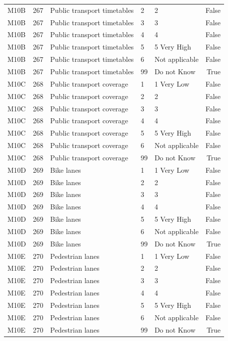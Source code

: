 \begin{tabular}{lrlllr}
M10B & 267 & Public transport timetables & 2 & 2 & False \\
M10B & 267 & Public transport timetables & 3 & 3 & False \\
M10B & 267 & Public transport timetables & 4 & 4 & False \\
M10B & 267 & Public transport timetables & 5 & 5 Very High & False \\
M10B & 267 & Public transport timetables & 6 & Not applicable & False \\
M10B & 267 & Public transport timetables & 99 & Do not Know & True \\
M10C & 268 & Public transport coverage & 1 & 1 Very Low & False \\
M10C & 268 & Public transport coverage & 2 & 2 & False \\
M10C & 268 & Public transport coverage & 3 & 3 & False \\
M10C & 268 & Public transport coverage & 4 & 4 & False \\
M10C & 268 & Public transport coverage & 5 & 5 Very High & False \\
M10C & 268 & Public transport coverage & 6 & Not applicable & False \\
M10C & 268 & Public transport coverage & 99 & Do not Know & True \\
M10D & 269 & Bike lanes & 1 & 1 Very Low & False \\
M10D & 269 & Bike lanes & 2 & 2 & False \\
M10D & 269 & Bike lanes & 3 & 3 & False \\
M10D & 269 & Bike lanes & 4 & 4 & False \\
M10D & 269 & Bike lanes & 5 & 5 Very High & False \\
M10D & 269 & Bike lanes & 6 & Not applicable & False \\
M10D & 269 & Bike lanes & 99 & Do not Know & True \\
M10E & 270 & Pedestrian lanes & 1 & 1 Very Low & False \\
M10E & 270 & Pedestrian lanes & 2 & 2 & False \\
M10E & 270 & Pedestrian lanes & 3 & 3 & False \\
M10E & 270 & Pedestrian lanes & 4 & 4 & False \\
M10E & 270 & Pedestrian lanes & 5 & 5 Very High & False \\
M10E & 270 & Pedestrian lanes & 6 & Not applicable & False \\
M10E & 270 & Pedestrian lanes & 99 & Do not Know & True \\

\end{tabular}
